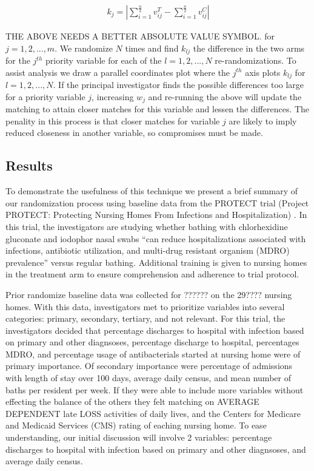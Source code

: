 \documentclass[]{sagej}
\begin{document}
\begin{eqnarray*}
 k_j = | \sum_{i = 1}^{\frac{n}{2}}v_{ij}^T - \sum_{i = 1}^{\frac{n}{2}}v_{ij}^C | 
\end{eqnarray*}

THE ABOVE NEEDS A BETTER ABSOLUTE VALUE SYMBOL. for
\(j = 1, 2, ..., m.\) We randomize \(N\) times and find \(k_{lj}\) the
difference in the two arms for the \(j^{th}\) priority variable for each
of the \(l = 1, 2, ..., N\) re-randomizations. To assist analysis we
draw a parallel coordinates plot where the \(j^{th}\) axis plots
\(k_{lj}\) for \(l = 1, 2, ..., N.\) If the principal investigator finds
the possible differences too large for a priority variable \(j\),
increasing \(w_j\) and re-running the above will update the matching to
attain closer matches for this variable and lessen the differences. The
penality in this process is that closer matches for variable \(j\) are
likely to imply reduced closeness in another variable, so compromises
must be made.

\subsection{Results}\label{results}

To demonstrate the usefulness of this technique we present a brief
summary of our randomization process using baseline data from the
PROTECT trial (Project PROTECT: Protecting Nursing Homes From Infections
and Hospitalization) \citep{ProtectTrial}. In this trial, the
investigators are studying whether bathing with chlorhexidine gluconate
and iodophor nasal swabs ``can reduce hospitalizations associated with
infections, antibiotic utilization, and multi-drug resistant organism
(MDRO) prevalence'' versus regular bathing. Additional training is given
to nursing homes in the treatment arm to ensure comprehension and
adherence to trial protocol.

Prior randomize baseline data was collected for ?????? on the 29????
nursing homes. With this data, investigators met to prioritize variables
into several categories: primary, secondary, tertiary, and not relevant.
For this trial, the investigators decided that percentage discharges to
hospital with infection based on primary and other diagnsoses,
percentage discharge to hospital, percentages MDRO, and percentage usage
of antibacterials started at nursing home were of primary importance. Of
secondary importance were percentage of admissions with length of stay
over 100 days, average daily census, and mean number of baths per
resident per week. If they were able to include more variables without
effecting the balance of the others they felt matching on AVERAGE
DEPENDENT late LOSS activities of daily lives, and the Centers for
Medicare and Medicaid Services (CMS) rating of eaching nursing home. To
ease understanding, our initial discussion will involve 2 variables:
percentage discharges to hospital with infection based on primary and
other diagnsoses, and average daily census.
\end{document}
